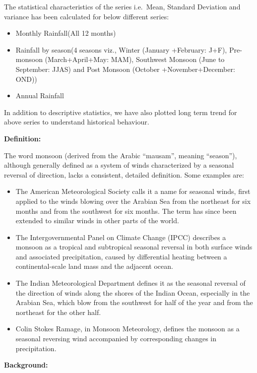 \documentclass[12pt,openany]{book}
\providecommand{\tightlist}{%
  \setlength{\itemsep}{0pt}\setlength{\parskip}{0pt}}
\begin{document}
The statistical characteristics of the series i.e.~Mean, Standard Deviation and variance has been calculated for below different series:

\begin{itemize}
\tightlist
\item
  Monthly Rainfall(All 12 months)
\item
  Rainfall by season(4 seasons viz., Winter (January +February: J+F), Pre-monsoon (March+April+May: MAM), Southwest Monsoon (June to September: JJAS) and Post Monsoon (October +November+December: OND))
\item
  Annual Rainfall
\end{itemize}

In addition to descriptive statistics, we have also plotted long term trend for above series to understand historical behaviour.

\textbf{Definition:}

The word monsoon (derived from the Arabic ``mausam'', meaning ``season''), although generally defined as a system of winds characterized by a seasonal reversal of direction, lacks a consistent, detailed definition. Some examples are:

\begin{itemize}
\tightlist
\item
  The American Meteorological Society calls it a name for seasonal winds, first applied to the winds blowing over the Arabian Sea from the northeast for six months and from the southwest for six months. The term has since been extended to similar winds in other parts of the world.
\item
  The Intergovernmental Panel on Climate Change (IPCC) describes a monsoon as a tropical and subtropical seasonal reversal in both surface winds and associated precipitation, caused by differential heating between a continental-scale land mass and the adjacent ocean.
\item
  The Indian Meteorological Department defines it as the seasonal reversal of the direction of winds along the shores of the Indian Ocean, especially in the Arabian Sea, which blow from the southwest for half of the year and from the northeast for the other half.
\item
  Colin Stokes Ramage, in Monsoon Meteorology, defines the monsoon as a seasonal reversing wind accompanied by corresponding changes in precipitation.
\end{itemize}

\textbf{Background:}
\end{document}

